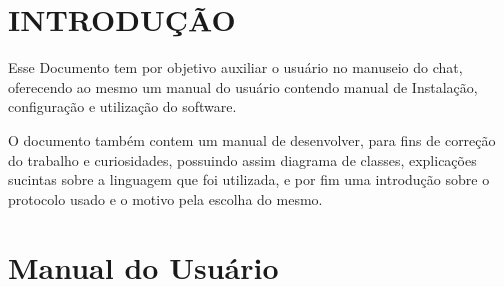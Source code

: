 \documentclass{abnt}
\begin{document}






\capa

\folhaderosto

\tableofcontents


\chapter{INTRODUÇÃO}
Esse Documento tem por objetivo auxiliar o usuário no manuseio do chat, oferecendo ao mesmo um manual do usuário contendo manual de Instalação, configuração e utilização do software.

O documento também contem um manual de desenvolver, para fins de correção do trabalho e curiosidades, possuindo assim diagrama de classes, explicações sucintas sobre a linguagem que foi utilizada, e por fim uma introdução sobre o protocolo usado e o motivo pela escolha do mesmo.

\clearpage
\chapter{Manual do Usuário}
\end{document}
